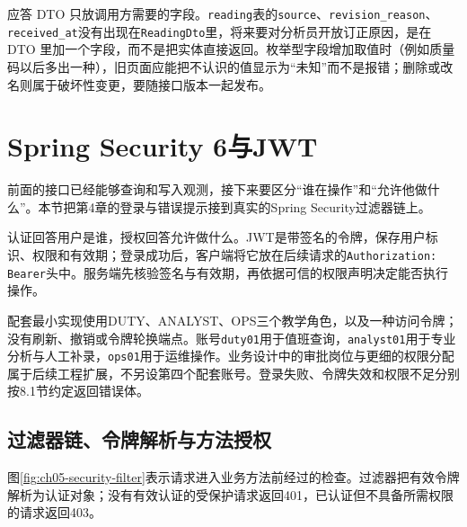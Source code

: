 应答 DTO 只放调用方需要的字段。\texttt{reading}表的\texttt{source}、\texttt{revision\_reason}、\texttt{received\_at}没有出现在\texttt{ReadingDto}里，将来要对分析员开放订正原因，是在 DTO 里加一个字段，而不是把实体直接返回。枚举型字段增加取值时（例如质量码以后多出一种），旧页面应能把不认识的值显示为“未知”而不是报错；删除或改名则属于破坏性变更，要随接口版本一起发布。

\section{Spring Security 6与JWT}

前面的接口已经能够查询和写入观测，接下来要区分“谁在操作”和“允许他做什么”。本节把第4章的登录与错误提示接到真实的Spring Security过滤器链上。

认证回答用户是谁，授权回答允许做什么。JWT是带签名的令牌，保存用户标识、权限和有效期；登录成功后，客户端将它放在后续请求的\texttt{Authorization: Bearer}头中。服务端先核验签名与有效期，再依据可信的权限声明决定能否执行操作\cite{rfc7519}。

配套最小实现使用DUTY、ANALYST、OPS三个教学角色，以及一种访问令牌；没有刷新、撤销或令牌轮换端点。账号\texttt{duty01}用于值班查询，\texttt{analyst01}用于专业分析与人工补录，\texttt{ops01}用于运维操作。业务设计中的审批岗位与更细的权限分配属于后续工程扩展，不另设第四个配套账号。登录失败、令牌失效和权限不足分别按8.1节约定返回错误体。

\subsection{过滤器链、令牌解析与方法授权}

图\ref{fig:ch05-security-filter}表示请求进入业务方法前经过的检查。过滤器把有效令牌解析为认证对象；没有有效认证的受保护请求返回401，已认证但不具备所需权限的请求返回403。

